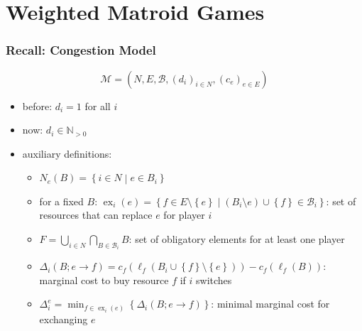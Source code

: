 \documentclass{beamer}
\newcommand{\tupel}[1]{\left(#1\right)}
\newcommand{\set}[1]{\left\{#1\right\}}
\DeclareMathOperator{\ex}{ex}
\begin{document}
\section{Weighted Matroid Games}
\begin{frame}
  \frametitle{Recall: Congestion Model}
  \begin{equation*}
    \mathcal{M} = \tupel{N, E, \mathcal{B}, \left(d_{i}\right)_{i\in N},
    \left(c_{e}\right)_{e\in E}}
  \end{equation*}
  \vspace{-1cm}
  \begin{itemize}
    \item before: $d_{i} = 1$ for all $i$
    \item<2-> now: $d_{i}\in\mathbb{N}_{>0}$ 
    \item<3-> auxiliary definitions:
      \begin{itemize}
        \item<4-> $N_{e}\tupel{B} = \set{i\in N\middle|e\in B_{i}}$
        \item<5-> for a fixed $B$: $\ex_{i}\tupel{e} =
          \set{f\in E\setminus\set{e}\middle|
          (B_{i}\setminus{e})\cup\set{f}\in\mathcal{B}_{i}}$: set of resources
          that can replace $e$ for player $i$
        \item<6-> $F = \bigcup_{i\in N}\bigcap_{B\in \mathcal{B}_{i}} B$:
          set of obligatory elements for at least one player
        \item<7-> $\Delta_{i}\tupel{B;e\rightarrow f} =
          c_{f}\tupel{\ell_{f}\tupel{B_{i}\cup\set{f}\setminus\set{e}}} -
          c_{f}\tupel{\ell_{f}\tupel{B}}$: marginal cost to buy resource $f$ if
          $i$ switches
        \item<8-> $\Delta_{i}^{e} = \min_{f\in\ex_{i}(e)}\set{\Delta_{i}(B;e\rightarrow f)}$:
          minimal marginal cost for exchanging $e$
      \end{itemize}
  \end{itemize}
\end{frame}
\end{document}
